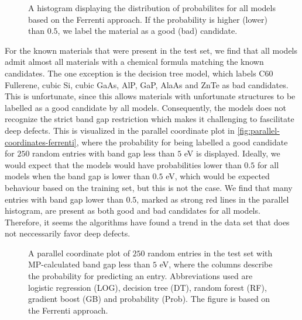 \begin{figure}[ht!]
    \centering
    
    \vspace*{-130mm}
    \caption{A histogram displaying the distribution of probabilites for all models based on the Ferrenti approach. If the probability is higher (lower) than $0.5$, we label the material as a good (bad) candidate.}
    \label{fig:histogram-ferrenti}
\end{figure}

For the known materials that were present in the test set, we find that all models admit almost all materials with a chemical formula matching the known candidates. The one exception is the decision tree model, which labels C60 Fullerene, cubic Si, cubic GaAs, AlP, GaP, AlaAs and ZnTe as bad candidates. This is unfortunate, since this allows materials with unfortunate structures to be labelled as a good candidate by all models. Consequently, the models does not recognize the strict band gap restriction which makes it challenging to fascilitate deep defects. This is visualized in the parallel coordinate plot in \autoref{fig:parallel-coordinates-ferrenti}, where the probability for being labelled a good candidate for $250$ random entries with band gap less than $5$ eV is displayed. Ideally, we would expect that the models would have probabilities lower than $0.5$ for all models when the band gap is lower than $0.5$ eV, which would be expected behaviour based on the training set, but this is not the case. We find that many entries with band gap lower than $0.5$, marked as strong red lines in the parallel histogram, are present as both good and bad candidates for all models. Therefore, it seems the algorithms have found a trend in the data set that does not neccessarily favor deep defects.

\begin{figure}[ht!]
    \centering
    
    \vspace*{-130mm}
    \caption{A parallel coordinate plot of $250$ random entries in the test set with MP-calculated band gap less than $5$ eV, where the columns describe the probability for predicting an entry. Abbreviations used are logistic regression (LOG), decision tree (DT), random forest (RF), gradient boost (GB) and probability (Prob). The figure is based on the Ferrenti approach.}
    \label{fig:parallel-coordinates-ferrenti}
\end{figure}

